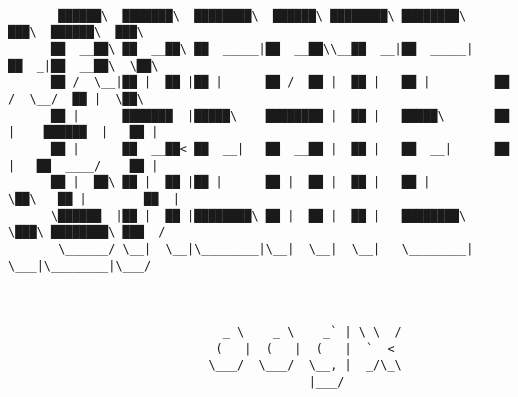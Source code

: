 \documentclass[varwidth=\maxdimen,margin=0.5cm,multi={verbatim}]{standalone}
\begin{document}
\begin{verbatim}

       ██████\  ███████\  ████████\  ██████\ ████████\ ████████\      ███\  ██████\  ███\
      ██  __██\ ██  __██\ ██  _____|██  __██\\__██  __|██  _____|    ██  _|██  __██\  \██\
      ██ /  \__|██ |  ██ |██ |      ██ /  ██ |  ██ |   ██ |         ██  /  \__/  ██ |  \██\
      ██ |      ███████  |█████\    ████████ |  ██ |   █████\       ██ |    ██████  |   ██ |
      ██ |      ██  __██< ██  __|   ██  __██ |  ██ |   ██  __|      ██ |   ██  ____/    ██ |
      ██ |  ██\ ██ |  ██ |██ |      ██ |  ██ |  ██ |   ██ |         \██\   ██ |        ██  |
      \██████  |██ |  ██ |████████\ ██ |  ██ |  ██ |   ████████\     \███\ ████████\ ███  /
       \______/ \__|  \__|\________|\__|  \__|  \__|   \________|      \___|\________|\___/


                             
                              _ \    _ \    _` | \ \  /
                             (   |  (   |  (   |  `  <
                            \___/  \___/  \__, |  _/\_\
                                          |___/


\end{verbatim}
\end{document}

